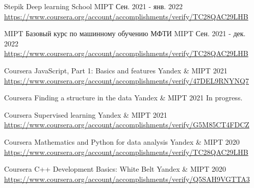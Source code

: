 

\begin{cventries}

    \cventry
    {Stepik} %
    {Deep learning School} %
    {MIPT} %
    {Сен. 2021 - янв. 2022} %
    {
        \href{https://www.coursera.org/account/accomplishments/verify/TC28QAC29LHB}{https://www.coursera.org/account/accomplishments/verify/TC28QAC29LHB}
    }
    
    \cventry
    {MIPT} %
    {Базовый курс по машинному обучению МФТИ} %
    {MIPT} %
    {Сен. 2021 - дек. 2022} %
    {
        \href{https://www.coursera.org/account/accomplishments/verify/TC28QAC29LHB}{https://www.coursera.org/account/accomplishments/verify/TC28QAC29LHB}
    }

    \cventry
    {Coursera} %
    {JavaScript, Part 1: Basics and features} %
    {Yandex \& MIPT} %
    {2021} %
    {
        \href{https://www.coursera.org/account/accomplishments/verify/47DEL9RNYNQ7}{https://www.coursera.org/account/accomplishments/verify/47DEL9RNYNQ7}
    }

    \cventry
    {Coursera} %
    {Finding a structure in the data} %
    {Yandex \& MIPT} %
    {2021} %
    {
        In progress.
    }

    \cventry
    {Coursera} %
    {Supervised learning} %
    {Yandex \& MIPT} %
    {2021} %
    {
        \href{https://www.coursera.org/account/accomplishments/verify/G5M85CT4FDCZ}{https://www.coursera.org/account/accomplishments/verify/G5M85CT4FDCZ}
    }

    \cventry
    {Coursera} %
    {Mathematics and Python for data analysis} %
    {Yandex \& MIPT} %
    {2020} %
    {
        \href{https://www.coursera.org/account/accomplishments/verify/TC28QAC29LHB}{https://www.coursera.org/account/accomplishments/verify/TC28QAC29LHB}
    }

    \cventry
    {Coursera} %
    {C++ Development Basics: White Belt} %
    {Yandex \& MIPT} %
    {2020} %
    {
        \href{https://www.coursera.org/account/accomplishments/verify/Q5SAH9VGTTA3}{https://www.coursera.org/account/accomplishments/verify/Q5SAH9VGTTA3}
    }
\end{cventries}
